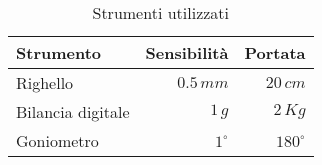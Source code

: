 \begin{table}[h!]
    \hspace{5mm} %
    \begin{tabular}{|l|r|r|}
        \hline
        Strumento & Sensibilità & Portata\\
        \hline
        Righello   & $0.5\,mm$ & $20\,cm$\\
        \hline
        Bilancia digitale   & $1\,g$ & $2\,Kg$\\
        \hline
        Goniometro   & $1^\circ$ & $180^\circ$\\
        \hline
    \end{tabular}
    \caption{Strumenti utilizzati}
    \label{strumenti}
\end{table}
